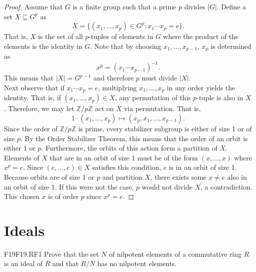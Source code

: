 \documentclass{article}
\newcommand{\Z}{\mathbb{Z}}
\newcommand{\inv}{^{-1}}
\newcommand{\sq}{\subseteq}
\theoremstyle{definition}
\begin{document}
	\begin{proof}
	Assume that $G$ is a finite group such that a prime $p$ divides $|G|$. Define a set $X \sq G^p$ as
		\[X = \{(x_1, \ldots, x_p) \in G^p: x_1 \cdots x_p = e\}. \]
	That is, $X$ is the set of all $p$-tuples of elements in $G$ where the product of the elements is the identity in $G$. Note that by choosing $x_1, \ldots, x_{p-1}$, $x_p$ is determined as
		\[x^p = (x_1 \cdots x_{p - 1})\inv. \]
	This means that $|X| = G^{p-1}$ and therefore $p$ must divide $|X|$.\\
	
	Next observe that if $x_1 \cdots x_p = e$, multiplying $x_1, \ldots, x_p$ in any order yields the identity. That is, if $(x_1, \ldots, x_p) \in X$, any permutation of this $p$-tuple is also in $X$. Therefore, we may let $\Z / p\Z$ act on $X$ via permutation. That is,
		\[1 \cdot (x_1, \ldots, x_p) \mapsto (x_p, x_1, \ldots, x_{p-1}). \]
	Since the order of $\Z / p\Z$ is prime, every stabilizer subgroup is either of size 1 or of size $p$. By the Order Stabilizer Theorem, this means that the order of an orbit is either 1 or $p$. Furthermore, the orbits of this action form a partition of $X$. Elements of $X$ that are in an orbit of size 1 must be of the form $(x, \ldots, x)$ where $x^p = e$. Since $(e, \ldots, e) \in X$ satisfies this condition, $e$ is in an orbit of size 1. Because orbits are of size 1 or $p$ and partition $X$, there exists some $x \neq e$ also in an orbit of size 1. If this were not the case, $p$ would not divide $X$, a contradiction. This chosen $x$ is of order $p$ since $x^p = e$.
	\end{proof}
	

\section{Ideals}

	\begin{prob}{F19}{F19.RF1}
	Prove that the set $N$ of nilpotent elements of a commutative ring $R$ is an ideal of $R$ and that $R/N$ has no nilpotent elements.
	\end{prob}
	
\end{document}
